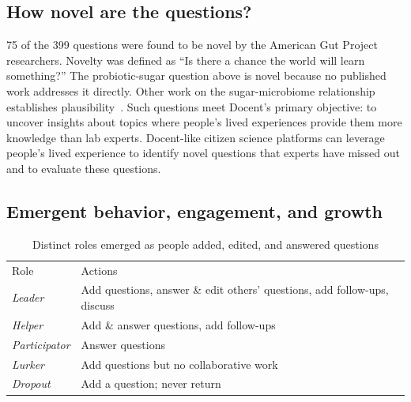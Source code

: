 \subsection{How novel are the questions?}
75 of the 399 questions were found to be novel by the American Gut Project researchers. Novelty was defined as “Is there a chance the world will learn something?” The probiotic-sugar question above is novel because no published work addresses it directly. Other work on the sugar-microbiome relationship establishes plausibility~\cite{Haukioja2008}. Such questions meet Docent’s primary objective: to uncover insights about topics where people’s lived experiences provide them more knowledge than lab experts. Docent-like citizen science platforms can leverage people’s lived experience to identify novel questions that experts have missed out and to evaluate these questions.

\subsection{Emergent behavior, engagement, and growth}

\vspace{0.25in}
\begin{table}[!ht]
\caption[Distinct roles emerged as people added, edited, and
answered questions]
{Distinct roles emerged as people added, edited, and
answered questions}

\vspace{-0.25in}
\begin{center}
\renewcommand{\arraystretch}{1.5}
\begin{tabular}{p{1in}p{4.5in}}
\hline
Role & Actions\\
\textit{Leader} 		& Add questions, answer \& edit others’ questions, add follow-ups, discuss \\
\textit{Helper} 		&  Add \& answer questions, add follow-ups\\
\textit{Participator} 	&  Answer questions\\
\textit{Lurker} 		&  Add questions but no collaborative work\\
\textit{Dropout} 	&  Add a question; never return\\
\hline
\end{tabular}
\end{center}
\label{d-tab:results2}
\end{table}


